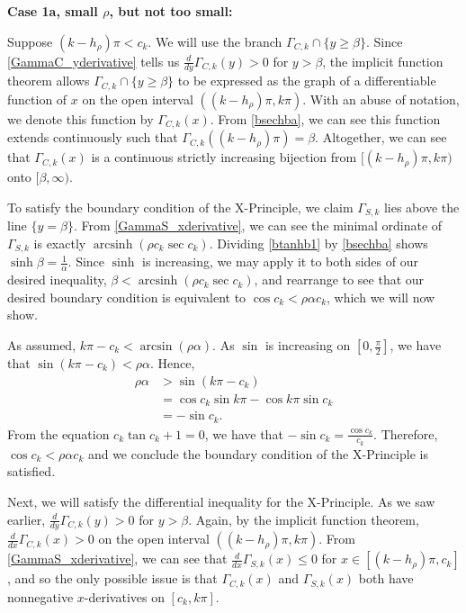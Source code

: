 \documentclass{amsart}
\theoremstyle{plain}
\numberwithin{theorem}{section}
\DeclareMathOperator{\arcsinh}{arcsinh}
\theoremstyle{definition}
\theoremstyle{remark}
\theoremstyle{brakets}
\begin{document}
\noindent \textbf{Case 1a, small $\rho$, but not too small:} 

Suppose $(k-h_\rho)\pi < c_k$.  We will use the branch $\Gamma_{C,k} \cap \{y \geq \beta\}$. Since \eqref{GammaC_yderivative} tells us $\frac{d}{dy}\Gamma_{C,k}(y) > 0$ for $y > \beta$, the implicit function theorem allows $\Gamma_{C,k} \cap \{y \geq \beta\}$ to be expressed as the graph of a differentiable function of $x$ on the open interval $((k-h_\rho)\pi,k\pi)$. With an abuse of notation, we denote this function by $\Gamma_{C,k}(x)$. From \eqref{bsechba}, we can see this function extends continuously such that $\Gamma_{C,k}((k-h_\rho)\pi) = \beta$. Altogether, we can see that $\Gamma_{C,k}(x)$ is a continuous strictly increasing bijection from $[(k-h_\rho)\pi,k\pi)$ onto $[\beta,\infty)$.


To satisfy the boundary condition of the X-Principle, we claim $\Gamma_{S,k}$ lies above the line $\{y = \beta\}$. From \eqref{GammaS_xderivative}, we can see the minimal ordinate of $\Gamma_{S,k}$ is exactly $\arcsinh(\rho c_k \sec c_k)$. Dividing \eqref{btanhb1} by \eqref{bsechba} shows $\sinh \beta = \frac{1}{\alpha}$. Since $\sinh$ is increasing, we may apply it to both sides of our desired inequality, $\beta < \arcsinh(\rho c_k \sec c_k)$, and rearrange to see that our desired boundary condition is equivalent to $\cos c_k < \rho\alpha c_k$, which we will now show.

As assumed, $k\pi - c_k < \arcsin(\rho\alpha)$. As $\sin$ is increasing on $[0,\frac{\pi}{2}]$, we have that $\sin(k\pi - c_k) < \rho\alpha$. Hence,
\begin{align*}
\rho\alpha &> \sin(k\pi - c_k) \\
&= \cos c_k\sin k\pi - \cos k\pi\sin c_k \\
&= -\sin c_k.
\end{align*}
\noindent From the equation $c_k\tan c_k + 1 = 0$, we have that $-\sin c_k = \frac{\cos c_k}{c_k}$. Therefore, $\cos c_k < \rho\alpha c_k$ and we conclude the boundary condition of the X-Principle is satisfied.

Next, we will satisfy the differential inequality for the X-Principle. As we saw earlier, $\frac{d}{dy} \Gamma_{C,k}(y) > 0$ for $y > \beta$. Again, by the implicit function theorem, $\frac{d}{dx} \Gamma_{C,k}(x) > 0$ on the open interval $((k-h_\rho)\pi,k\pi)$. From \eqref{GammaS_xderivative}, we can see that $\frac{d}{dx}\Gamma_{S,k}(x) \leq 0$ for $x \in [(k-h_\rho)\pi,c_k]$, and so the only possible issue is that $\Gamma_{C,k}(x)$ and $\Gamma_{S,k}(x)$ both have nonnegative $x$-derivatives on $[c_k,k\pi]$. 
\end{document}
